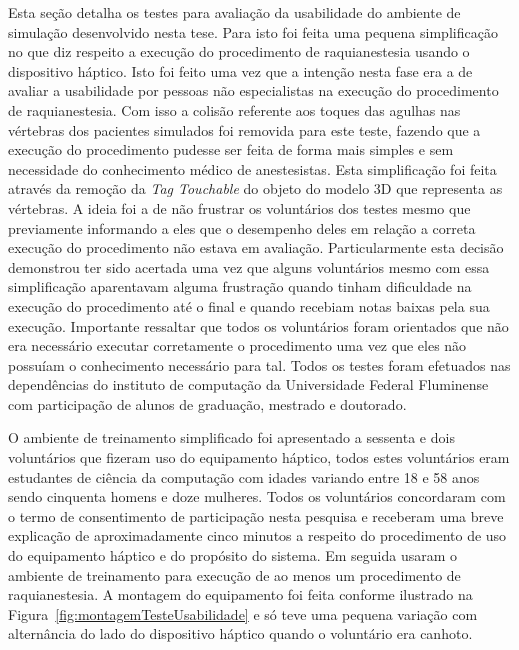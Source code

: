 Esta seção detalha os testes para avaliação da usabilidade do ambiente de simulação desenvolvido nesta tese. Para isto foi feita uma pequena simplificação no que diz respeito a execução do procedimento de raquianestesia usando o dispositivo háptico. Isto foi feito uma vez que a intenção nesta fase era a de avaliar a usabilidade por pessoas não especialistas na execução do procedimento de raquianestesia. Com isso a colisão referente aos toques das agulhas nas vértebras dos pacientes simulados foi removida para este teste, fazendo que a execução do procedimento pudesse ser feita de forma mais simples e sem necessidade do conhecimento médico de anestesistas. Esta simplificação foi feita através da remoção da \textit{Tag Touchable} do objeto do modelo 3D que representa as vértebras. 
A ideia foi a de não frustrar os voluntários dos testes mesmo que previamente informando a eles que o desempenho deles em relação a correta execução do procedimento não estava em avaliação. Particularmente esta decisão  demonstrou ter sido acertada uma vez que alguns voluntários mesmo com essa simplificação aparentavam alguma frustração quando tinham dificuldade na execução do procedimento até o final e quando recebiam notas baixas pela sua execução. Importante ressaltar que todos os voluntários foram orientados que não era necessário executar corretamente o procedimento uma vez que eles não possuíam o conhecimento necessário para tal. Todos os testes foram efetuados nas dependências do instituto de computação da Universidade Federal Fluminense com participação de alunos de graduação, mestrado e doutorado.

O ambiente de treinamento simplificado foi apresentado a sessenta e dois voluntários que fizeram uso do equipamento háptico, todos estes voluntários eram estudantes de ciência da computação com idades variando entre 18 e 58 anos sendo cinquenta homens e doze mulheres. Todos os voluntários concordaram com o termo de consentimento de participação nesta pesquisa e receberam uma breve explicação de aproximadamente cinco minutos a respeito do procedimento de uso do equipamento háptico e do propósito do sistema. Em seguida usaram o ambiente de treinamento para execução de ao menos um procedimento de raquianestesia. A montagem do equipamento foi feita conforme ilustrado na Figura~\ref{fig:montagemTesteUsabilidade} e só teve uma pequena variação com alternância do lado do dispositivo háptico quando o voluntário era canhoto.

